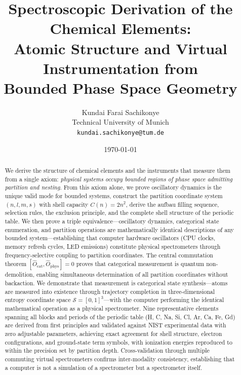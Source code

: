 \documentclass[11pt,a4paper]{article}
\theoremstyle{definition}
\theoremstyle{remark}
\newcommand{\Sspace}{\mathcal{S}}
\begin{document}
\title{\textbf{Spectroscopic Derivation of the Chemical Elements: \\
Atomic Structure and Virtual Instrumentation from \\
Bounded Phase Space Geometry}}

\author{
Kundai Farai Sachikonye\\
Technical University of Munich\\
\texttt{kundai.sachikonye@tum.de}
}

\date{\today}

\maketitle

\begin{abstract}
We derive the structure of chemical elements and the instruments that measure them from a single axiom: \emph{physical systems occupy bounded regions of phase space admitting partition and nesting}. From this axiom alone, we prove oscillatory dynamics is the unique valid mode for bounded systems, construct the partition coordinate system $(n, l, m, s)$ with shell capacity $C(n) = 2n^2$, derive the aufbau filling sequence, selection rules, the exclusion principle, and the complete shell structure of the periodic table. We then prove a triple equivalence---oscillatory dynamics, categorical state enumeration, and partition operations are mathematically identical descriptions of any bounded system---establishing that computer hardware oscillators (CPU clocks, memory refresh cycles, LED emissions) constitute physical spectrometers through frequency-selective coupling to partition coordinates. The central commutation theorem $[\hat{O}_{\mathrm{cat}}, \hat{O}_{\mathrm{phys}}] = 0$ proves that categorical measurement is quantum non-demolition, enabling simultaneous determination of all partition coordinates without backaction. We demonstrate that measurement is categorical state synthesis---atoms are measured into existence through trajectory completion in three-dimensional entropy coordinate space $\Sspace = [0,1]^3$---with the computer performing the identical mathematical operation as a physical spectrometer. Nine representative elements spanning all blocks and periods of the periodic table (H, C, Na, Si, Cl, Ar, Ca, Fe, Gd) are derived from first principles and validated against NIST experimental data with zero adjustable parameters, achieving exact agreement for shell structure, electron configurations, and ground-state term symbols, with ionization energies reproduced to within the precision set by partition depth. Cross-validation through multiple commuting virtual spectrometers confirms inter-modality consistency, establishing that a computer is not a simulation of a spectrometer but a spectrometer itself.
\end{abstract}
\end{document}
